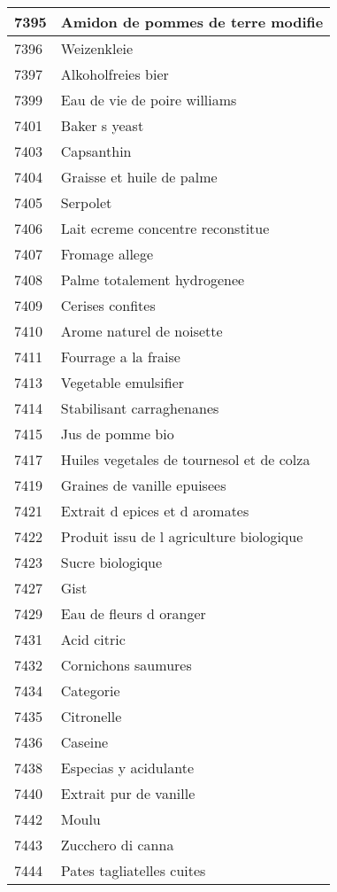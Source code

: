 \begin{longtable}{|l|l|}
7395 & Amidon de pommes de terre modifie \\ \hline 
7396 & Weizenkleie \\ \hline 
7397 & Alkoholfreies bier \\ \hline 
7399 & Eau de vie de poire williams \\ \hline 
7401 & Baker s yeast \\ \hline 
7403 & Capsanthin \\ \hline 
7404 & Graisse et huile de palme \\ \hline 
7405 & Serpolet \\ \hline 
7406 & Lait ecreme concentre reconstitue \\ \hline 
7407 & Fromage allege \\ \hline 
7408 & Palme totalement hydrogenee \\ \hline 
7409 & Cerises confites \\ \hline 
7410 & Arome naturel de noisette \\ \hline 
7411 & Fourrage a la fraise \\ \hline 
7413 & Vegetable emulsifier \\ \hline 
7414 & Stabilisant carraghenanes \\ \hline 
7415 & Jus de pomme bio \\ \hline 
7417 & Huiles vegetales de tournesol et de colza \\ \hline 
7419 & Graines de vanille epuisees \\ \hline 
7421 & Extrait d epices et d aromates \\ \hline 
7422 & Produit issu de l agriculture biologique \\ \hline 
7423 & Sucre biologique \\ \hline 
7427 & Gist \\ \hline 
7429 & Eau de fleurs d oranger \\ \hline 
7431 & Acid citric \\ \hline 
7432 & Cornichons saumures \\ \hline 
7434 & Categorie \\ \hline 
7435 & Citronelle \\ \hline 
7436 & Caseine \\ \hline 
7438 & Especias y acidulante \\ \hline 
7440 & Extrait pur de vanille \\ \hline 
7442 & Moulu \\ \hline 
7443 & Zucchero di canna \\ \hline 
7444 & Pates tagliatelles cuites \\ \hline 

\end{longtable}
